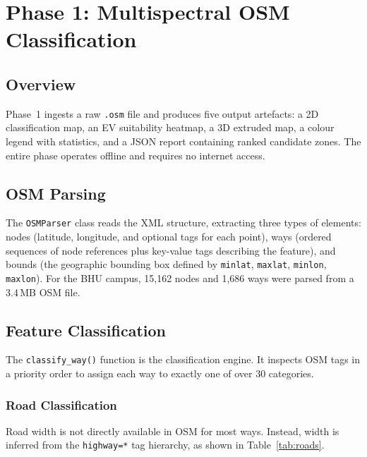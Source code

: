 \documentclass[conference]{IEEEtran}
\begin{document}
\section{Phase 1: Multispectral OSM Classification}

\subsection{Overview}

Phase~1 ingests a raw \texttt{.osm} file and produces five output artefacts: a 2D classification map, an EV suitability heatmap, a 3D extruded map, a colour legend with statistics, and a JSON report containing ranked candidate zones. The entire phase operates offline and requires no internet access.

\subsection{OSM Parsing}

The \texttt{OSMParser} class reads the XML structure, extracting three types of elements: nodes (latitude, longitude, and optional tags for each point), ways (ordered sequences of node references plus key-value tags describing the feature), and bounds (the geographic bounding box defined by \texttt{minlat}, \texttt{maxlat}, \texttt{minlon}, \texttt{maxlon}). For the BHU campus, 15,162 nodes and 1,686 ways were parsed from a 3.4\,MB OSM file.

\subsection{Feature Classification}

The \texttt{classify\_way()} function is the classification engine. It inspects OSM tags in a priority order to assign each way to exactly one of over 30 categories.

\subsubsection{Road Classification}

Road width is not directly available in OSM for most ways. Instead, width is inferred from the \texttt{highway=*} tag hierarchy, as shown in Table~\ref{tab:roads}.
\end{document}
